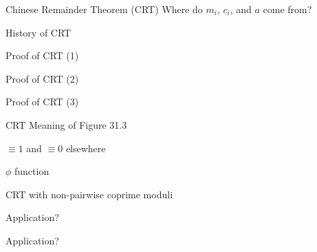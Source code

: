 \begin{frame}{Chinese Remainder Theorem (CRT)}
  Where do $m_i$, $c_i$, and $a$ come from?
\end{frame}
\begin{frame}{History of CRT}
\end{frame}
\begin{frame}{Proof of CRT (1)}
\end{frame}
\begin{frame}{Proof of CRT (2)}
\end{frame}
\begin{frame}{Proof of CRT (3)}
\end{frame}
\begin{frame}{CRT}
  Meaning of Figure 31.3

  $\equiv 1$ and $\equiv 0$ elsewhere
\end{frame}
\begin{frame}{$\phi$ function}
\end{frame}
\begin{frame}{CRT with non-pairwise coprime moduli}
\end{frame}
\begin{frame}{}
\end{frame}
\begin{frame}{Application?}
\end{frame}
\begin{frame}{Application?}
\end{frame}
